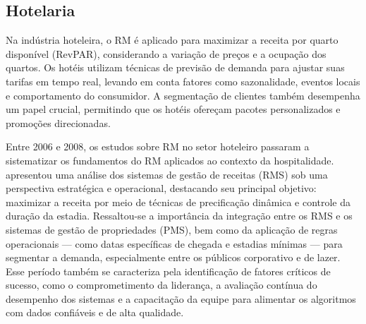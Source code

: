 

\subsection{Hotelaria}
Na indústria hoteleira, o RM é aplicado para maximizar a receita por quarto disponível (RevPAR), considerando a variação de preços e a ocupação dos quartos. Os hotéis utilizam técnicas de previsão de demanda para ajustar suas tarifas em tempo real, levando em conta fatores como sazonalidade, eventos locais e comportamento do consumidor. A segmentação de clientes também desempenha um papel crucial, permitindo que os hotéis ofereçam pacotes personalizados e promoções direcionadas.

Entre 2006 e 2008, os estudos sobre RM no setor hoteleiro passaram a sistematizar os fundamentos do RM aplicados ao contexto da hospitalidade. \citet{Avinal15022006} apresentou uma análise dos sistemas de gestão de receitas (RMS) sob uma perspectiva estratégica e operacional, destacando seu principal objetivo: maximizar a receita por meio de técnicas de precificação dinâmica e controle da duração da estadia. Ressaltou-se a importância da integração entre os RMS e os sistemas de gestão de propriedades (PMS), bem como da aplicação de regras operacionais — como datas específicas de chegada e estadias mínimas — para segmentar a demanda, especialmente entre os públicos corporativo e de lazer. Esse período também se caracteriza pela identificação de fatores críticos de sucesso, como o comprometimento da liderança, a avaliação contínua do desempenho dos sistemas e a capacitação da equipe para alimentar os algoritmos com dados confiáveis e de alta qualidade.

